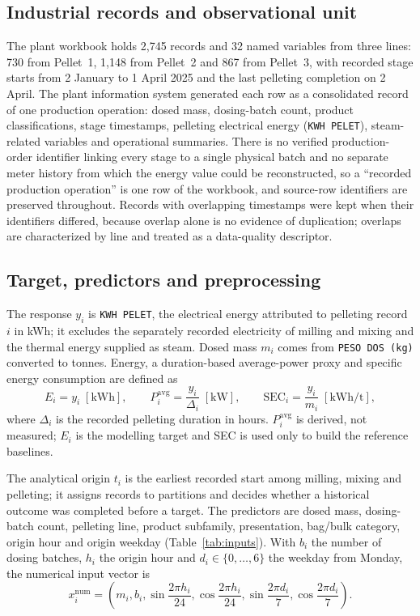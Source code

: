 \subsection{Industrial records and observational unit}
The plant workbook holds 2,745 records and 32 named variables from three lines: 730 from Pellet~1, 1,148 from Pellet~2 and 867 from Pellet~3, with recorded stage starts from 2 January to 1 April 2025 and the last pelleting completion on 2 April. The plant information system generated each row as a consolidated record of one production operation: dosed mass, dosing-batch count, product classifications, stage timestamps, pelleting electrical energy (\texttt{KWH PELET}), steam-related variables and operational summaries. There is no verified production-order identifier linking every stage to a single physical batch and no separate meter history from which the energy value could be reconstructed, so a ``recorded production operation'' is one row of the workbook, and source-row identifiers are preserved throughout. Records with overlapping timestamps were kept when their identifiers differed, because overlap alone is no evidence of duplication; overlaps are characterized by line and treated as a data-quality descriptor.

\subsection{Target, predictors and preprocessing}
The response $y_i$ is \texttt{KWH PELET}, the electrical energy attributed to pelleting record $i$ in kWh; it excludes the separately recorded electricity of milling and mixing and the thermal energy supplied as steam. Dosed mass $m_i$ comes from \texttt{PESO DOS (kg)} converted to tonnes. Energy, a duration-based average-power proxy and specific energy consumption are defined as
\begin{equation}
 E_i=y_i\;[\mathrm{kWh}],\qquad
 P_i^{\mathrm{avg}}=\frac{y_i}{\Delta_i}\;[\mathrm{kW}],\qquad
 \mathrm{SEC}_i=\frac{y_i}{m_i}\;[\mathrm{kWh/t}],
 \label{eq:units}
\end{equation}
where $\Delta_i$ is the recorded pelleting duration in hours. $P_i^{\mathrm{avg}}$ is derived, not measured; $E_i$ is the modelling target and SEC is used only to build the reference baselines.

The analytical origin $t_i$ is the earliest recorded start among milling, mixing and pelleting; it assigns records to partitions and decides whether a historical outcome was completed before a target. The predictors are dosed mass, dosing-batch count, pelleting line, product subfamily, presentation, bag/bulk category, origin hour and origin weekday (Table~\ref{tab:inputs}). With $b_i$ the number of dosing batches, $h_i$ the origin hour and $d_i\in\{0,\ldots,6\}$ the weekday from Monday, the numerical input vector is
\begin{equation}
 x_i^{\mathrm{num}}=\left(m_i,b_i,\sin\frac{2\pi h_i}{24},\cos\frac{2\pi h_i}{24},
 \sin\frac{2\pi d_i}{7},\cos\frac{2\pi d_i}{7}\right).
 \label{eq:inputs}
\end{equation}


